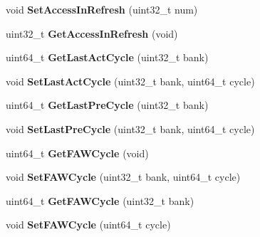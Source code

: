 \begin{DoxyCompactItemize}
\item 
\hypertarget{classMemRankBase_ab2b3338aee684271469fbcb008f09834}{void {\bfseries Set\-Access\-In\-Refresh} (uint32\-\_\-t num)}\label{classMemRankBase_ab2b3338aee684271469fbcb008f09834}

\item 
\hypertarget{classMemRankBase_ac923937912dd8d601e4390b8a0dd098f}{uint32\-\_\-t {\bfseries Get\-Access\-In\-Refresh} (void)}\label{classMemRankBase_ac923937912dd8d601e4390b8a0dd098f}

\item 
\hypertarget{classMemRankBase_a853d565b6036ec7c856e0d31f8e0a5dd}{uint64\-\_\-t {\bfseries Get\-Last\-Act\-Cycle} (uint32\-\_\-t bank)}\label{classMemRankBase_a853d565b6036ec7c856e0d31f8e0a5dd}

\item 
\hypertarget{classMemRankBase_a5901d260fdfffc68ff384dc2d73b6eb9}{void {\bfseries Set\-Last\-Act\-Cycle} (uint32\-\_\-t bank, uint64\-\_\-t cycle)}\label{classMemRankBase_a5901d260fdfffc68ff384dc2d73b6eb9}

\item 
\hypertarget{classMemRankBase_a0861380baea379e2285684a16b4f5fa0}{uint64\-\_\-t {\bfseries Get\-Last\-Pre\-Cycle} (uint32\-\_\-t bank)}\label{classMemRankBase_a0861380baea379e2285684a16b4f5fa0}

\item 
\hypertarget{classMemRankBase_a5af10b120b0e024cef6a604502a73780}{void {\bfseries Set\-Last\-Pre\-Cycle} (uint32\-\_\-t bank, uint64\-\_\-t cycle)}\label{classMemRankBase_a5af10b120b0e024cef6a604502a73780}

\item 
\hypertarget{classMemRankBase_afc20190d248a82987c4807713a0b98ee}{uint64\-\_\-t {\bfseries Get\-F\-A\-W\-Cycle} (void)}\label{classMemRankBase_afc20190d248a82987c4807713a0b98ee}

\item 
\hypertarget{classMemRankBase_aee6e9d1eb430ad2778e4d15a664104e5}{void {\bfseries Set\-F\-A\-W\-Cycle} (uint32\-\_\-t bank, uint64\-\_\-t cycle)}\label{classMemRankBase_aee6e9d1eb430ad2778e4d15a664104e5}

\item 
\hypertarget{classMemRankBase_abaed63f78841d8ff3b17c0d118947869}{uint64\-\_\-t {\bfseries Get\-F\-A\-W\-Cycle} (uint32\-\_\-t bank)}\label{classMemRankBase_abaed63f78841d8ff3b17c0d118947869}

\item 
\hypertarget{classMemRankBase_abbdadf20ed4c1a1ce485feff4bff611f}{void {\bfseries Set\-F\-A\-W\-Cycle} (uint64\-\_\-t cycle)}\label{classMemRankBase_abbdadf20ed4c1a1ce485feff4bff611f}

\end{DoxyCompactItemize}
